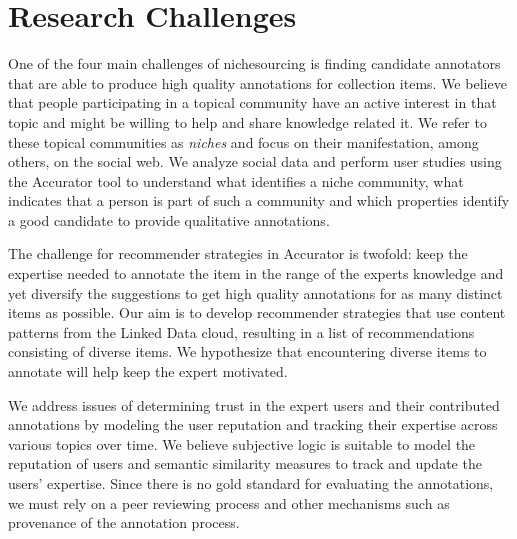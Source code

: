 \section{Research Challenges}
\label{use_case}

One of the four main challenges of nichesourcing is finding candidate annotators that are able to produce high quality annotations for collection items. 
We believe that people participating in a topical community have an active interest in that topic and might be willing to help and share knowledge related it. We refer to these topical communities as \textit{niches} and focus on their manifestation, among others, on the social web. We analyze social data and perform user studies using the Accurator tool to understand what identifies a niche community, what indicates that a person is part of such a community and which properties identify a good candidate to provide qualitative annotations. 

The challenge for recommender strategies in Accurator is twofold: keep the expertise needed to annotate the item in the range of the experts knowledge and yet diversify the suggestions to get high quality annotations for as many distinct items as possible. 
Our aim is to develop recommender strategies that use content patterns from the Linked Data cloud, resulting in a list of recommendations consisting of diverse items. 
We hypothesize that encountering diverse items to annotate will help keep the expert motivated.

We address issues of determining trust in the expert users and their contributed annotations by modeling the user reputation and tracking their expertise across various topics over time. We believe subjective logic is suitable to model the reputation of users and semantic similarity measures to track and update the users' expertise. Since there is no gold standard for evaluating the annotations, we must rely on a peer reviewing process and other mechanisms such as provenance of the annotation process.


